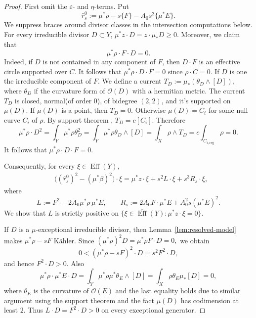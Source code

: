 \documentclass[reqno]{amsart}
\theoremstyle{remark}
\newcommand{\reg}{\text{reg}}
\def\cO{{\mathcal O}}
\theoremstyle{plain}
\begin{document}
\begin{proof}
    First omit the $\varepsilon$- and $\eta$-terms.  Put
\[
 \widehat r_s^0:=\mu^*\rho-s\{F\}-A_0s^2\{\mu^*E\}.
\]We suppress braces around divisor classes in the intersection computations below. 
For every irreducible divisor $D\subset Y$, $\mu^*z\cdot D=z\cdot\mu_*D\geq0.$
Moreover, we claim that 
\begin{equation}\label{eq:linear-exceptional-zero}
 \mu^*\rho\cdot F\cdot D=0.
\end{equation}
Indeed, if $D$ is not contained in any component of $F$, then $D\cdot F$ is an effective circle supported over $C$. It follows that $\mu^*\rho\cdot D\cdot F=0$ since $\rho\cdot C=0$. If $D$ is one the irreducible component of $F$. We define a current $T_D:=\mu_*(\theta_D\wedge[D])$, where $\theta_D$ if the curvature form of $\cO(D)$ with a hermitian metric. The current $T_D$ is closed, normal(of order $0$), of bidegree $(2,2)$, and it's supported on $\mu(D)$. If $\mu(D)$ is a point, then $T_D=0$. Otherwise $\mu(D)=C_i$ for some null curve $C_i$ of $\rho$.  By support theorem \cite[Corollary 2.14]{D12}, $T_D=c[C_i]$. Therefore \[
\mu^*\rho \cdot D^2=\int_Y\mu^*\rho\theta_D^2=\int_Y\mu^*\rho \theta_D\wedge[D]=\int_X\rho \wedge T_D=c\int_{C_{i,\reg}}\rho=0.
\]
It follows that $\mu^*\rho \cdot D\cdot F=0.$


Consequently, for every
$\xi\in\overline{\operatorname{Eff}}(Y)$,
\begin{equation}\label{eq:second-expansion}
\begin{aligned}
 &\bigl((\widehat r_s^0)^2-(\mu^*\beta)^2\bigr)\cdot\xi=\mu^*z\cdot\xi+s^2L\cdot\xi+s^3R_s\cdot\xi,
\end{aligned}
\end{equation}
where
\[
 L:=F^2-2A_0\mu^*\rho\,\mu^*E,
 \qquad
 R_s:=2A_0F\cdot\mu^*E+A_0^2s(\mu^*E)^2.
\]
We show that $L$ is strictly positive on $\{\xi\in\overline{\operatorname{Eff}}(Y):\mu^*z\cdot\xi=0\}$.

If $D$ is a $\mu$-exceptional irreducible divisor, then
Lemma~\ref{lem:resolved-model} makes
$\mu^*\rho-sF$ K\"ahler.  Since $(\mu^*\rho)^2D=\mu^*\rho F\cdot D=0,$
we obtain
\[
 0<(\mu^*\rho-sF)^2\cdot D=s^2F^2\cdot D,
\]
and hence $F^2\cdot D>0$.  Also
\[
 \mu^*\rho\cdot\mu^*E\cdot D=\int_Y\mu^*\rho \mu^*\theta_E\wedge[D]=\int_X\rho\theta_E\mu_*[D]=0,
\]
where $\theta_E$ is the curvature of $\cO(E)$ and the last equality holds due to similar argument using the support theorem and the fact $\mu(D)$ has codimension at least $2$.
Thus $L\cdot D=F^2\cdot D>0 $ on every exceptional generator.


\end{proof}
\end{document}
